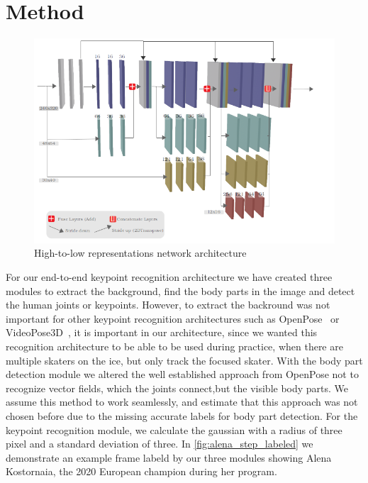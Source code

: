 

\chapter{Method} %

\label{Method} %


\vspace*{\fill}
\begin{figure}[th]
    \centering
    \includegraphics[width=150mm]{Figures/custom_hrnet_lines.png}
    \decoRule
    \caption[HRNetV3]{High-to-low representations network architecture}
    \label{fig:custom_hrnet}
\end{figure}
For our end-to-end keypoint recognition architecture we have created three modules to extract the background,
find the body parts in the image and detect the human joints or keypoints.
However, to extract the backround was not important for other keypoint recognition architectures such as
OpenPose~\cite{openpose} or VideoPose3D~\cite{videopose3d}, it is important in our architecture, since we wanted
this recognition architecture to be able to be used during practice, when there are multiple skaters on the ice,
but only track the focused skater.
With the body part detection module we altered the well established approach from OpenPose not to recognize vector
fields, which the joints connect,but the visible body parts.
We assume this method to work seamlessly, and estimate that this approach was not chosen before due to the missing
accurate labels for body part detection.
For the keypoint recognition module, we calculate the gaussian with a radius of three pixel and a standard deviation of
three.
In \autoref{fig:alena_step_labeled} we demonstrate an example frame labeld by our three modules
showing Alena Kostornaia, the 2020 European champion during her program.

